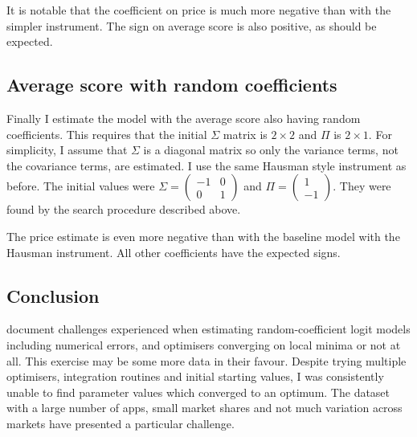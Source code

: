 \documentclass[parskip=half]{scrartcl}
\begin{document}
It is notable that the coefficient on price is much more negative than with the simpler instrument. The sign on average score is also positive, as should be expected.

\subsection{Average score with random coefficients}

Finally I estimate the model with the average score also having random coefficients.
%
This requires that the initial \(\Sigma\) matrix is \(2 \times 2\) and \(\Pi\) is \(2 \times 1\). For simplicity, I assume that \(\Sigma\) is a diagonal matrix so only the variance terms, not the covariance terms, are estimated. I use the same Hausman style instrument as before.
%
The initial values were \(\Sigma = \begin{pmatrix}
-1 & 0\\
0 & 1
\end{pmatrix}\) and \(\Pi = \begin{pmatrix}
1 \\
-1
\end{pmatrix}\). They were found by the search procedure described above.



The price estimate is even more negative than with the baseline model with the Hausman instrument. All other coefficients have the expected signs.

\subsection{Conclusion}

\cite{knittel2014estimation} document challenges experienced when estimating random-coefficient logit models including numerical errors, and optimisers converging on local minima or not at all. This exercise may be some more data in their favour. Despite trying multiple optimisers, integration routines and initial starting values, I was consistently unable to find parameter values which converged to an optimum. The dataset with a large number of apps, small market shares and not much variation across markets have presented a particular challenge.

\printbibliography
\end{document}
